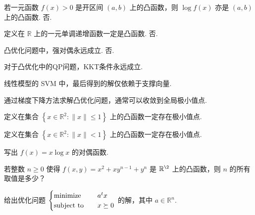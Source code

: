 \begin{problem}[判断]
    若一元函数 $f(x) > 0$ 是开区间 $(a, b)$ 上的凸函数，则 $\log f(x)$ 亦是 $(a, b)$ 上的凸函数.
    \Answer 否.
\end{problem}

\begin{problem}[判断]
    定义在 $\mathbb{R}$ 上的一元单调递增函数一定是凸函数.
    \Answer 否.
\end{problem}

\begin{problem}[判断]
    凸优化问题中，强对偶永远成立.
    \Answer 否.
\end{problem}

\begin{problem}[判断]
    对于凸优化中的QP问题，KKT条件永远成立.
    \Answer 
\end{problem}

\begin{problem}[判断]
    线性模型的 SVM 中，最后得到的解仅依赖于支撑向量.
    \Answer 
\end{problem}

\begin{problem}[判断]
    通过梯度下降方法求解凸优化问题，通常可以收敛到全局极小值点.
    \Answer 
\end{problem}

\begin{problem}[判断]
    定义在集合 $\left\{x \in \mathbb{R}^2: \|x\| \le 1\right\}$ 上的凸函数一定存在极小值点.
    \Answer 
\end{problem}

\begin{problem}[判断]
    定义在集合 $\left\{x \in \mathbb{R}^2: \|x\| < 1\right\}$ 上的凸函数一定存在极小值点.
    \Answer 
\end{problem}

\begin{problem}[问答]
    写出 $f(x) = x\log x$ 的对偶函数.
    \Answer 
\end{problem}

\begin{problem}[问答]
    若整数 $n \ge 0$ 使得 $f(x, y) = x^2 + xy^{n - 1} + y^n$ 是 $\mathbb{R}^\2$ 上的凸函数，则 $n$ 的所有取值是多少？
    \Answer 
\end{problem}

\begin{problem}[问答]
    给出优化问题 $\begin{cases}
        \operatorname{minimize} \quad & a^tx\\
        \operatorname{subject\ to} \quad & x \succeq 0
    \end{cases}$ 的解，其中 $a\in \mathbb{R}^n$.
    \Answer 
\end{problem}


